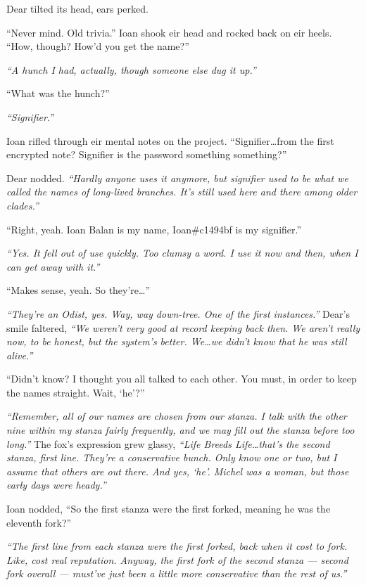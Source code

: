 Dear tilted its head, ears perked.

``Never mind. Old trivia.'' Ioan shook eir head and rocked back on eir heels. ``How, though? How'd you get the name?''

\emph{``A hunch I had, actually, though someone else dug it up.''}

``What was the hunch?''

\emph{``Signifier.''}

Ioan rifled through eir mental notes on the project. ``Signifier\ldots{}from the first encrypted note? Signifier is the password something something?''

Dear nodded. \emph{``Hardly anyone uses it anymore, but signifier used to be what we called the names of long-lived branches. It's still used here and there among older clades.''}

``Right, yeah. Ioan Balan is my name, Ioan\#c1494bf is my signifier.''

\emph{``Yes. It fell out of use quickly. Too clumsy a word. I use it now and then, when I can get away with it.''}

``Makes sense, yeah. So they're\ldots{}''

\emph{``They're an Odist, yes. Way, way down-tree. One of the first instances.''} Dear's smile faltered, \emph{``We weren't very good at record keeping back then. We aren't really now, to be honest, but the system's better. We\ldots{}we didn't know that he was still alive.''}

``Didn't know? I thought you all talked to each other. You must, in order to keep the names straight. Wait, `he'?''

\emph{``Remember, all of our names are chosen from our stanza. I talk with the other nine within my stanza fairly frequently, and we may fill out the stanza before too long.''} The fox's expression grew glassy, \emph{``Life Breeds Life\ldots{}that's the second stanza, first line. They're a conservative bunch. Only know one or two, but I assume that others are out there. And yes, `he'. Michel was a woman, but those early days were heady.''}

Ioan nodded, ``So the first stanza were the first forked, meaning he was the eleventh fork?''

\emph{``The first line from each stanza were the first forked, back when it cost to fork. Like, cost real reputation. Anyway, the first fork of the second stanza — second fork overall — must've just been a little more conservative than the rest of us.''}

